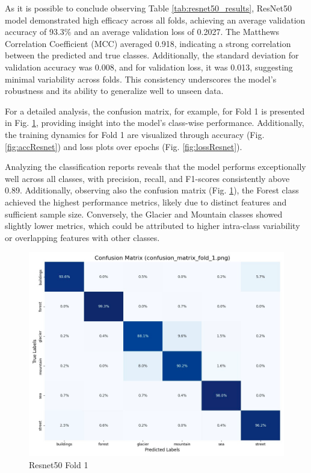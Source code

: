 \documentclass[conference]{IEEEtran}
\begin{document}
As it is possible to conclude observing Table \ref{tab:resnet50_results}, ResNet50 model demonstrated high efficacy across all folds, achieving an average validation accuracy of 93.3\% and an average validation loss of 0.2027. The Matthews Correlation Coefficient (\ac{MCC}) averaged 0.918, indicating a strong correlation between the predicted and true classes. Additionally, the standard deviation for validation accuracy was 0.008, and for validation loss, it was 0.013, suggesting minimal variability across folds. This consistency underscores the model's robustness and its ability to generalize well to unseen data.


For a detailed analysis, the confusion matrix, for example, for Fold 1 is presented in Fig. \ref{fig:conf_matrix_resnet}, providing insight into the model's class-wise performance. Additionally, the training dynamics for Fold 1 are visualized through accuracy (Fig. \ref{fig:accResnet}) and loss plots over epochs (Fig. \ref{fig:lossResnet}).

Analyzing the classification reports reveals that the model performs exceptionally well across all classes, with precision, recall, and F1-scores consistently above 0.89. Additionally, observing also the confusion matrix (Fig. \ref{fig:conf_matrix_resnet}), the Forest class achieved the highest performance metrics, likely due to distinct features and sufficient sample size. Conversely, the Glacier and Mountain classes showed slightly lower metrics, which could be attributed to higher intra-class variability or overlapping features with other classes.


\begin{figure} 
    \centering
    \includegraphics[width=\linewidth]{img/confusion_matrix_resnet50.png}
    \caption{Resnet50 Fold 1}
    \label{fig:conf_matrix_resnet}
\end{figure}
\end{document}
